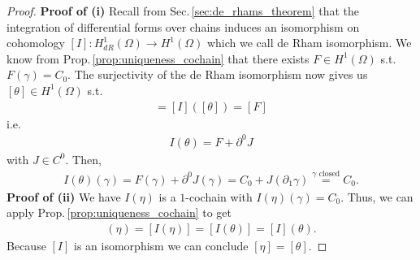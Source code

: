 \documentclass[12pt,a4paper]{article}
\numberwithin{equation}{subsection}
\numberwithin{lemma}{subsection}
\theoremstyle{definition}
\begin{document}
\begin{proof}
    \textbf{Proof of (i)}
    Recall from Sec.\,\ref{sec:de_rhams_theorem} 
    that the integration of differential forms 
    over chains induces an isomorphism on cohomology 
    $[I]: H_{dR}^1(\Omega) \rightarrow H^1(\Omega)$ which we call 
    de Rham isomorphism. We know from 
    Prop.\,\ref{prop:uniqueness_cochain} that there exists $F\in H^1(\Omega)$ 
    s.t. $F(\gamma) = C_0$. The surjectivity of the de Rham isomorphism 
    now gives us $[\theta] \in H^1(\Omega)$ s.t.
    \begin{align*}
        [I(\theta)] = [I]([\theta]) = [F]
    \end{align*}
    i.e.
    \begin{align*}
        I(\theta) = F + \partial^0 J
    \end{align*}
    with $J \in C^0$. Then, 
    \begin{align*}
        I(\theta)(\gamma) = F(\gamma) + \partial^0 J(\gamma) 
        = C_0 + J(\partial_1 \gamma) 
        \stackrel{\text{$\gamma$ closed}}{=} C_0. 
    \end{align*}
    \textbf{Proof of (ii)}
    We have $I(\eta)$ is a $1$-cochain with $I(\eta)(\gamma) = C_0$.
    Thus, we can apply Prop.\,\ref{prop:uniqueness_cochain} to get
    \begin{align*}
        [I](\eta)=[I(\eta)] = [I(\theta)]=[I](\theta).
    \end{align*}
    Because $[I]$ is an isomorphism we can conclude $[\eta] = [\theta]$.
\end{proof}
\end{document}
